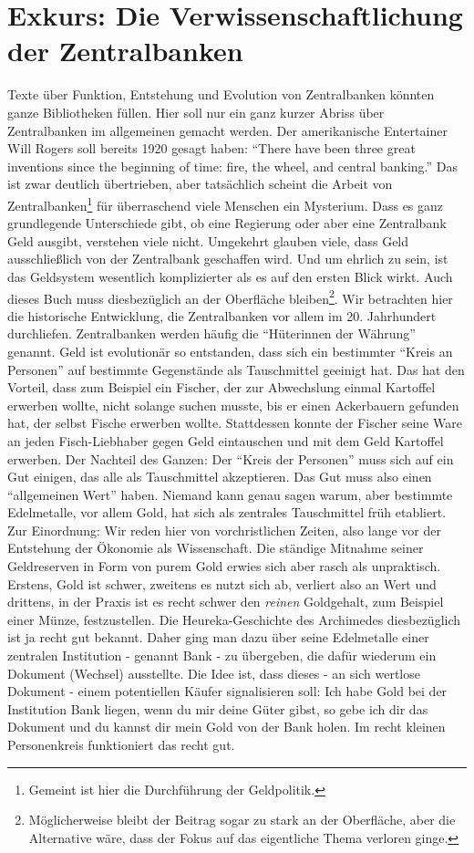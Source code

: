 \section*{Exkurs: Die Verwissenschaftlichung der Zentralbanken}

Texte über Funktion, Entstehung und Evolution von Zentralbanken könnten ganze Bibliotheken füllen. Hier soll nur ein ganz kurzer Abriss über Zentralbanken im allgemeinen gemacht werden. Der amerikanische Entertainer Will Rogers soll bereits 1920 gesagt haben: "`There have been three great inventions since the beginning of time: fire, the wheel, and central banking."' Das ist zwar deutlich übertrieben, aber tatsächlich scheint die Arbeit von Zentralbanken\footnote{Gemeint ist hier die Durchführung der Geldpolitik.} für überraschend viele Menschen ein Mysterium. Dass es ganz grundlegende Unterschiede gibt, ob eine Regierung oder aber eine Zentralbank Geld ausgibt, verstehen viele nicht. Umgekehrt glauben viele, dass Geld ausschließlich von der Zentralbank geschaffen wird. Und um ehrlich zu sein, ist das Geldsystem wesentlich komplizierter als es auf den ersten Blick wirkt. Auch dieses Buch muss diesbezüglich an der Oberfläche bleiben\footnote{Möglicherweise bleibt der Beitrag sogar zu stark an der Oberfläche, aber die Alternative wäre, dass der Fokus auf das eigentliche Thema verloren ginge.}. Wir betrachten hier die historische Entwicklung, die Zentralbanken vor allem im 20. Jahrhundert durchliefen. Zentralbanken werden häufig die "`Hüterinnen der Währung"' genannt. Geld ist evolutionär so entstanden, dass sich ein bestimmter "`Kreis an Personen"' auf bestimmte Gegenstände als Tauschmittel geeinigt hat. Das hat den Vorteil, dass zum Beispiel ein Fischer, der zur Abwechslung einmal Kartoffel erwerben wollte, nicht solange suchen musste, bis er einen Ackerbauern gefunden hat, der selbst Fische erwerben wollte. Stattdessen konnte der Fischer seine Ware an jeden Fisch-Liebhaber gegen Geld eintauschen und mit dem Geld Kartoffel erwerben. Der Nachteil des Ganzen: Der "`Kreis der Personen"' muss sich auf ein Gut einigen, das alle als Tauschmittel akzeptieren. Das Gut muss also einen "`allgemeinen Wert"' haben. Niemand kann genau sagen warum, aber bestimmte Edelmetalle, vor allem Gold, hat sich als zentrales Tauschmittel früh etabliert. Zur Einordnung: Wir reden hier von vorchristlichen Zeiten, also lange vor der Entstehung der Ökonomie als Wissenschaft. Die ständige Mitnahme seiner Geldreserven in Form von purem Gold erwies sich aber rasch als unpraktisch. Erstens, Gold ist schwer, zweitens es nutzt sich ab, verliert also an Wert und drittens, in der Praxis ist es recht schwer den \textit{reinen} Goldgehalt, zum Beispiel einer Münze, festzustellen. Die Heureka-Geschichte des Archimedes diesbezüglich ist ja recht gut bekannt. Daher ging man dazu über seine Edelmetalle einer zentralen Institution - genannt Bank - zu übergeben, die dafür wiederum ein Dokument (Wechsel) ausstellte. Die Idee ist, dass dieses - an sich wertlose Dokument - einem potentiellen Käufer signalisieren soll: Ich habe Gold bei der Institution Bank liegen, wenn du mir deine Güter gibst, so gebe ich dir das Dokument und du kannst dir mein Gold von der Bank holen. Im recht kleinen Personenkreis funktioniert das recht gut. 